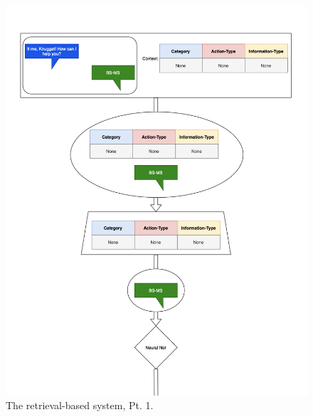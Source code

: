 \documentclass[titlepage, 12pt]{article}
\begin{document}
\begin{figure}[p]
    \centering\includegraphics[width=1\linewidth]{images/retrieval-1.png}
    \caption{The retrieval-based system, Pt. 1.}
\end{figure}
\end{document}
